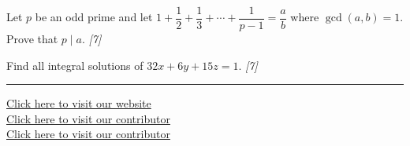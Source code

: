 \documentclass[11pt,a4paper]{article}
\newcommand{\pts}[1]{\hfill   \textit{[#1]}}
\begin{document}
\begin{parts}
  \item Let $p$ be an odd prime and let $1 + \dfrac{1}{2} + \dfrac{1}{3} + \cdots + \dfrac{1}{p-1} = \dfrac{a}{b}$ where $\gcd(a,b) = 1$. Prove that $p \mid a$. \pts{7}
  \item Find all integral solutions of $32x + 6y + 15z = 1$. \pts{7}
\end{parts}

\vfill\rule{\linewidth}{0.4pt}

\begin{center}\small
  \href{https://bhu-exam.vercel.app/}{Click here to visit our website}\\[4pt]
  \href{https://me-aryan.vercel.app/}{Click here to visit our contributor}\\[4pt]
  \href{https://quashan-me.vercel.app/}{Click here to visit our contributor}
\end{center}
\end{document}
